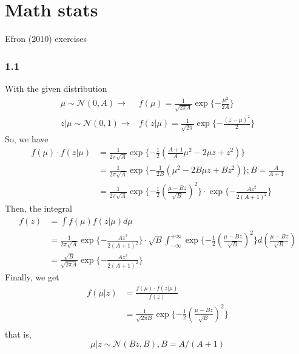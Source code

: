 \documentclass{article}
\begin{document}
\section*{Math stats}
Efron (2010) exercises

\subsubsection*{1.1}
With the given distribution
\begin{displaymath}
\begin{split}
\mu \sim \mathcal{N}(0,A) \rightarrow  &
f(\mu) = \frac{1}{\sqrt{2 \pi A}} \exp\{-\frac{\mu^2}{2A}\}  \\
z|\mu \sim \mathcal{N}(0,1) \rightarrow & 
f(z|\mu) = \frac{1}{\sqrt{2 \pi}} \exp\{-\frac{(z-\mu)^2}{2}\}
\end{split}
\end{displaymath}
So, we have
\begin{displaymath}
\begin{split}
f(\mu)\cdot f(z|\mu) &= \frac{1}{2\pi \sqrt{A}} \exp \{-\frac{1}{2}
(\frac{A+1}{A}\mu^2 - 2\mu z + z^2)\} \\
& = \frac{1}{2\pi \sqrt{A}} \exp \{-\frac{1}{2B}
(\mu^2 - 2B\mu z + Bz^2)\} ;       B=\frac{A}{A+1} \\
& = \frac{1}{2\pi \sqrt{A}} \exp \{-\frac{1}{2} (\frac{\mu -  Bz}{\sqrt{B}})^2\} 
\cdot \exp \{-\frac{Az^2}{2(A+1)^2} \} 
\end{split}
\end{displaymath}
Then, the integral
\begin{displaymath}
\begin{split}
f(z) &= \int {f(\mu)f(z|\mu)} d\mu \\
& = \frac{1}{2\pi \sqrt{A}} \exp \{-\frac{Az^2}{2(A+1)^2} \} 
\cdot \sqrt{B} \int_{-\infty}^{+\infty}  
\exp \{-\frac{1}{2} (\frac{\mu -  Bz}{\sqrt{B}})^2\} 
d (\frac{\mu -  Bz}{\sqrt{B}}) \\
& = \frac{\sqrt{B}}{\sqrt{2\pi A}} \exp \{-\frac{Az^2}{2(A+1)^2} \} 
\end{split}
\end{displaymath}
Finally, we get
\begin{displaymath}
\begin{split}
f(\mu |z) &= \frac{f(\mu)\cdot f(z|\mu)}{f(z)} \\
& = \frac{1}{\sqrt{2\pi B}} \exp \{-\frac{1}{2} (\frac{\mu -  Bz}{\sqrt{B}})^2\} \\
\end{split}
\end{displaymath}
that is, 
\begin{displaymath}
\mu |z \sim \mathcal{N}(Bz, B) , B= A/(A+1)
\end{displaymath}
\end{document}
